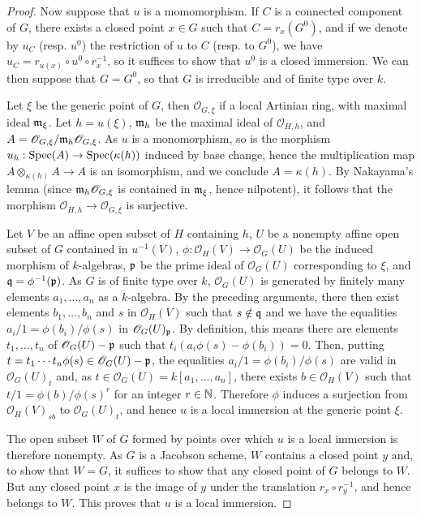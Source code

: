 \begin{proof}
Now suppose that $u$ is a momomorphism. If $C$ is a connected component of $G$, there exists a closed point $x\in G$ such that $C=r_x(G^0)$,  and if we denote by $u_C$ (resp. $u^0$) the restriction of $u$ to $C$ (resp. to $G^0$), we have $u_C=r_{u(x)}\circ u^0\circ r_x^{-1}$, so it suffices to show that $u^0$ is a closed immersion. We can then suppose that $G=G^0$, so that $G$ is irreducible and of finite type over $k$.\par
Let $\xi$ be the generic point of $G$, then $\mathscr{O}_{G,\xi}$ if a local Artinian ring, with maximal ideal $\mathfrak{m}_\xi$. Let $h=u(\xi)$, $\mathfrak{m}_h$ be the maximal ideal of $\mathscr{O}_{H,h}$, and $A=\mathscr{O}_{G,\xi}/\mathfrak{m}_h\mathscr{O}_{G,\xi}$. As $u$ is a monomorphism, so is the morphism $u_h:\mathrm{Spec}(A)\to\mathrm{Spec}(\kappa(h))$ induced by base change, hence the multiplication map $A\otimes_{\kappa(h)}A\to A$ is an isomorphism, and we conclude $A=\kappa(h)$. By Nakayama's lemma (since $\mathfrak{m}_h\mathscr{O}_{G,\xi}$ is contained in $\mathfrak{m}_\xi$, hence nilpotent), it follows that the morphism $\mathscr{O}_{H,h}\to\mathscr{O}_{G,\xi}$ is surjective.\par
Let $V$ be an affine open subset of $H$ containing $h$, $U$ be a nonempty affine open subset of $G$ contained in $u^{-1}(V)$, $\phi:\mathscr{O}_H(V)\to\mathscr{O}_G(U)$ be the induced morphism of $k$-algebras, $\mathfrak{p}$ be the prime ideal of $\mathscr{O}_G(U)$ corresponding to $\xi$, and $\mathfrak{q}=\phi^{-1}(\mathfrak{p})$. As $G$ is of finite type over $k$, $\mathscr{O}_G(U)$ is generated by finitely many elements $a_1,\dots,a_n$ as a $k$-algebra. By the preceding arguments, there then exist elements $b_1,\dots,b_n$ and $s$ in $\mathscr{O}_H(V)$ such that $s\notin\mathfrak{q}$ and we have the equalities $a_i/1=\phi(b_i)/\phi(s)$ in $\mathscr{O}_G(U)_{\mathfrak{p}}$. By definition, this means there are elements $t_1,\dots,t_n$ of $\mathscr{O}_G(U)-\mathfrak{p}$ such that $t_i(a_i\phi(s)-\phi(b_i))=0$. Then, putting $t=t_1\cdots t_n\phi(s)\in\mathscr{O}_G(U)-\mathfrak{p}$, the equalities $a_i/1=\phi(b_i)/\phi(s)$ are valid in $\mathscr{O}_G(U)_t$ and, as $t\in\mathscr{O}_G(U)=k[a_1,\dots,a_n]$, there exists $b\in\mathscr{O}_H(V)$ such that $t/1=\phi(b)/\phi(s)^r$ for an integer $r\in\mathbb{N}$. Therefore $\phi$ induces a surjection from $\mathscr{O}_H(V)_{sb}$ to $\mathscr{O}_G(U)_t$, and hence $u$ is a local immersion at the generic point $\xi$.\par
The open subset $W$ of $G$ formed by points over which $u$ is a local immersion is therefore nonempty. As $G$ is a Jacobson scheme, $W$ contains a closed point $y$ and, to show that $W=G$, it suffices to show that any closed point of $G$ belongs to $W$. But any closed point $x$ is the image of $y$ under the translation $r_x\circ r_y^{-1}$, and hence belongs to $W$. This proves that $u$ is a local immersion.\par

\end{proof}
